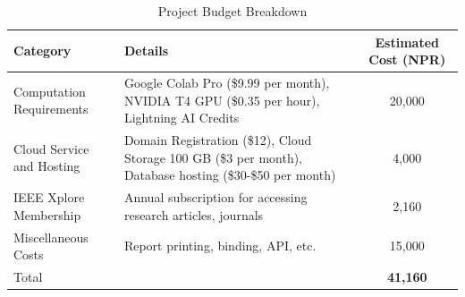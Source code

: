 \begin{table}[H]
    \centering
    \small
    \caption{Project Budget Breakdown}
    \begin{tabular}{p{3.5cm}p{5.5cm}c}
        \toprule
        \textbf{Category} & \textbf{Details} & \textbf{Estimated Cost (NPR)} \\
        \midrule
        Computation Requirements & Google Colab Pro (\$9.99 per month), NVIDIA T4 GPU (\$0.35 per hour), Lightning AI Credits & 20,000 \\
        Cloud Service and Hosting & Domain Registration (\$12), Cloud Storage 100 GB (\$3 per month), Database hosting (\$30-\$50 per month) & 4,000 \\
        IEEE Xplore Membership & Annual subscription for accessing research articles, journals & 2,160 \\
        Miscellaneous Costs & Report printing, binding, API, etc. & 15,000 \\
        \midrule
        Total & & \textbf{41,160} \\
        \bottomrule
    \end{tabular}
    \label{tab:project_budget}
\end{table}


